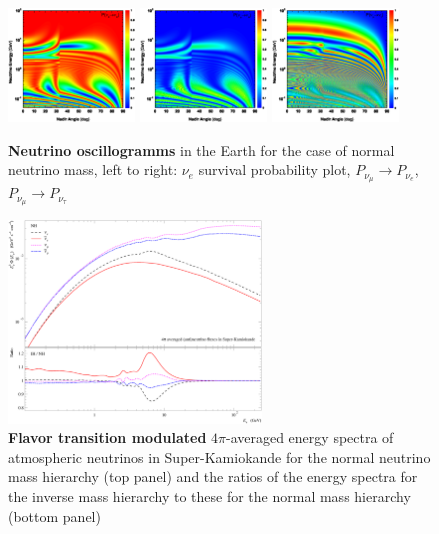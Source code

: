 \begin{figure}[htb!]
\begin{center}
\includegraphics[width=0.3\textwidth]{./MSW/Pee-NH2.eps}
\includegraphics[width=0.3\textwidth]{./MSW/Pme-NH2.eps}
\includegraphics[width=0.3\textwidth]{./MSW/Pmt-NH2.eps}
\caption{\label{ogramms}\textbf{Neutrino oscillogramms} in the Earth for the case of normal neutrino mass, left to right: $\nu_{e}$ survival probability plot, $P_{\nu_{\mu}}\to{}P_{\nu_{e}}$, $P_{\nu_{\mu}}\to{}P_{\nu_{\tau}}$}
\end{center}
\end{figure}

\begin{figure}[htb!]
\begin{center}
\includegraphics[width=0.6\textwidth]{./MSW/dF_dE_Honda11.eps}
\caption{\label{modspectra}\textbf{Flavor transition modulated} $4\pi$-averaged energy spectra of atmospheric neutrinos in Super-Kamiokande for the normal neutrino mass hierarchy (top panel) and the ratios of the energy spectra for the inverse mass hierarchy to these for the normal mass hierarchy (bottom panel)}
\end{center}
\end{figure}

